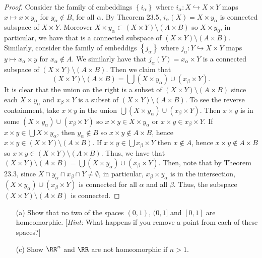 \begin{proof}
Consider the family of embeddings $\left\{i_\alpha\right\}$
where $i_\alpha\colon X\hookrightarrow X\times Y$ maps
$x\mapsto x\times y_\alpha$ for $y_\alpha\notin B$, for all
$\alpha$. By Theorem 23.5, $i_\alpha(X)=X\times y_\alpha$ is
connected subspace of $X\times Y$. Moreover $X\times
y_\alpha\subset(X\times Y)\setminus(A\times B)$ so $X\times y_0$,
in particular, we have that is a connected subspace of $(X\times
Y)\setminus(A\times B)$. Similarly, consider the family of
embeddigs $\left\{j_\alpha\right\}$ where $j_\alpha\colon
Y\hookrightarrow X\times Y$ maps $y\mapsto x_\alpha\times y$ for
$x_\alpha\notin A$. We similarly have that
$j_\alpha(Y)=x_\alpha\times Y$ is a connected subspace of
$(X\times Y)\setminus(A\times B)$. Then we claim that
\[
(X\times Y)\setminus(A\times B)
=\bigcup (X\times y_\alpha)\cup(x_\beta\times Y).
\]
It is clear that the union on the right is a subset of $(X\times
Y)\setminus(A\times B)$ since each $X\times y_\alpha$ and
$x_\beta\times Y$ is a subset of $(X\times Y)\setminus(A\times
B)$. To see the reverse containment, take $x\times y$ in the
union $\bigcup (X\times y_\alpha)\cup(x_\beta\times Y)$. Then
$x\times y$ is in some $(X\times y_\alpha)\cup(x_\beta\times Y)$
so $x\times y\in X\times y_\alpha$ or $x\times y\in x_\beta\times
Y$. If $x\times y\in\bigcup X\times y_\alpha$, then
$y_\alpha\notin B$ so $x\times y\notin A\times B$, hence $x\times
y\in(X\times Y)\setminus(A\times B)$. If $x\times y\in\bigcup
x_\beta\times Y$ then $x\notin A$, hence $x\times y\notin
A\times B$ so $x\times y\in(X\times Y)\setminus(A\times
B)$. Thus, we have that $(X\times Y)\setminus(A\times
B)=\bigcup (X\times y_\alpha)\cup(x_\beta\times Y)$. Then, note
that by Theorem 23.3, since $X\cap  y_\alpha\cap x_\beta\cap
Y\neq\emptyset$, in particular, $x_\beta\times y_\alpha$ is in
the intersection, $(X\times y_\alpha)\cup(x_\beta\times Y)$ is
connected for all $\alpha$ and all $\beta$. Thus, the subspace
$(X\times Y)\setminus(A\times B)$ is connected.
\end{proof}
\newpage
\begin{problem}[Munkres \S24, Ex.\,1(ac)]
\begin{enumerate}[noitemsep]
\item[(a)] Show that no two of the spaces $(0,1)$, $(0,1]$ and
  $[0,1]$ are homeomorphic. [\emph{Hint:} What happens if you
  remove a point from each of these spaces?]
\item[(c)] Show $\RR^n$ and $\RR$ are not homeomorphic if $n>1$.
\end{enumerate}
\end{problem}
